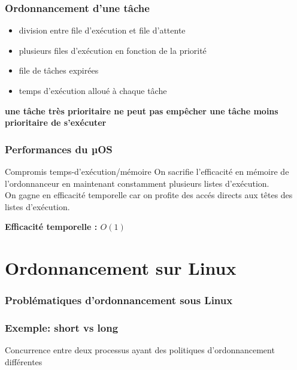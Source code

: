 \documentclass{beamer}
\begin{document}
\begin{frame}
    \frametitle{Ordonnancement d'une tâche}

    \begin{itemize}
        \item division entre file d'exécution et file d'attente
        \item plusieurs files d'exécution en fonction de la priorité
        \item file de tâches expirées
        \item temps d'exécution alloué à chaque tâche
    \end{itemize}

    \begin{center}
        \bfseries
        une tâche très prioritaire ne peut pas empêcher une tâche moins
        prioritaire de s'exécuter
    \end{center}
\end{frame}

\begin{frame}
    \frametitle{Performances du µOS}

    \begin{block}{Compromis temps-d'exécution/mémoire}
        On sacrifie l'efficacité en mémoire de l'ordonnanceur en maintenant
        constamment plusieurs listes d'exécution. \\
        On gagne en efficacité temporelle car on profite des accés directs aux
        têtes des listes d'exécution.
    \end{block}

     {
        \begin{center}
            \bfseries
            Efficacité temporelle : $O(1)$
        \end{center}
    }
\end{frame}

\section{Ordonnancement sur Linux}

\begin{frame}
    \frametitle{Problématiques d'ordonnancement sous Linux}

\end{frame}

\begin{frame}
    \frametitle{Exemple: short vs long}

    \begin{center}
        \huge
        Concurrence entre deux processus ayant des politiques d'ordonnancement
        différentes
    \end{center}
\end{frame}
\end{document}
